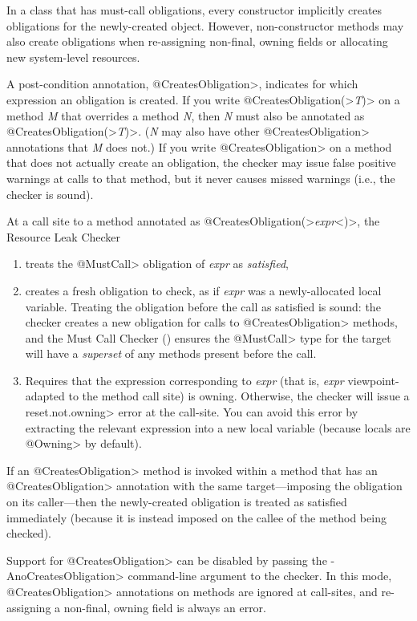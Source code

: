 In a class that has must-call obligations,
every constructor implicitly creates obligations for the newly-created object.
However, non-constructor methods may also create obligations
when re-assigning non-final, owning fields or allocating
new system-level resources.

A post-condition annotation,
\<@CreatesObligation>,
indicates for which expression an obligation is created.
If you write \<@CreatesObligation(>\emph{T}\<)> on a method \emph{M} that
overrides a method \emph{N}, then \emph{N} must also be annotated as
\<@CreatesObligation(>\emph{T}\<)>.  (\emph{N} may also have other
\<@CreatesObligation> annotations that \emph{M} does not.)
If you write \<@CreatesObligation> on a method that does not actually
create an obligation, the checker may issue false positive warnings at calls to
that method, but it never causes
missed warnings (i.e., the checker is sound).

At a call site to a method annotated as
\<@CreatesObligation(>\emph{expr}<)>, the Resource Leak Checker
\begin{enumerate}
\item
  treats the \<@MustCall> obligation of \emph{expr} as \emph{satisfied},
\item
  creates a fresh obligation to check, as if \emph{expr} was a newly-allocated local
  variable.  Treating the obligation before the call as satisfied is sound: the
  checker creates a new obligation for calls to \<@CreatesObligation> methods,
  and the Must Call Checker () ensures the
  \<@MustCall> type for the target will have a \emph{superset} of any methods
  present before the call.
\item
  Requires that the expression corresponding to \emph{expr} (that is, \emph{expr}
  viewpoint-adapted to the method call site) is owning.  Otherwise, the checker
  will issue a \<reset.not.owning> error at the call-site. You can avoid this
  error by extracting the relevant expression into a new local variable (because
  locals are \<@Owning> by default).
\end{enumerate}

If an \<@CreatesObligation>
method is invoked within a method that has an \<@CreatesObligation> annotation
with the same target---imposing the obligation on its caller---then
the newly-created obligation is treated as satisfied immediately (because it is instead imposed
on the callee of the method being checked).

Support for \<@CreatesObligation> can be disabled by passing the \<-AnoCreatesObligation> command-line
argument to the checker. In this mode, \<@CreatesObligation> annotations on methods are ignored at call-sites,
and re-assigning a non-final, owning field is always an error.


